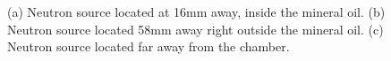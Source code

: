 \documentclass[%
12pt,
twoside,
reprint,
amsmath,amssymb,
aps,
]{article}
\begin{document}
	\begin{figure}[H]%
		\centering
		\qquad
		\qquad
		\caption{\label{tab:table-name} (a) Neutron source located at 16mm away, inside the mineral oil. (b) Neutron source located 58mm away right outside the mineral oil. (c) Neutron source located far away from the chamber.}%
	\end{figure}
\end{document}
